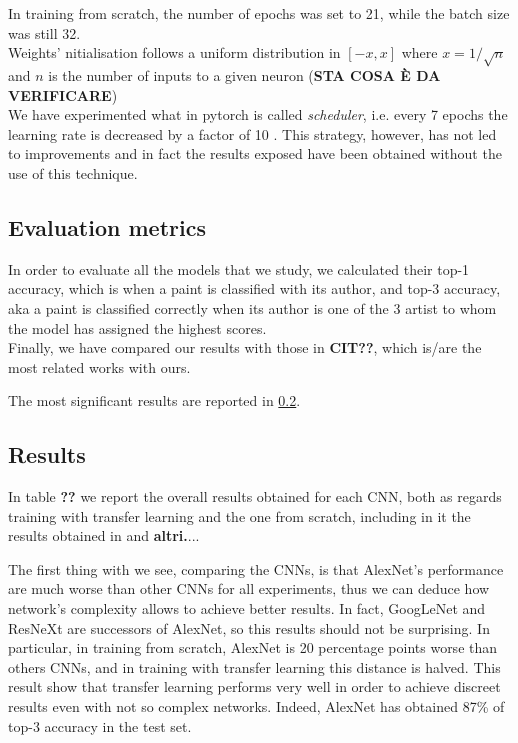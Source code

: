 \documentclass{article}
\begin{document}
In training from scratch, the number of epochs was set to 21, while the batch size was still 32.\\ 
Weights' nitialisation follows a uniform distribution in $[-x, x]$ where $x=1/\sqrt n$ and $n$ is the number of inputs to a given neuron (\textbf{STA COSA È DA VERIFICARE})\\
We have experimented what in pytorch is called \textit{scheduler}, i.e. every 7 epochs the learning rate is decreased by a factor of 10 . This strategy, however, has not led to improvements and in fact the results exposed have been obtained without the use of this technique.

\subsection{Evaluation metrics}
In order to evaluate all the models that we study, we calculated their top-1 accuracy, which is when a paint is classified with its author, and top-3 accuracy, aka a paint is classified correctly when its author is one of the 3 artist to whom the model has assigned the highest scores.\\
Finally, we have compared our results with those in \textbf{CIT??}, which is/are the most related works with ours. 

The most significant results are reported in \ref{results}.

\subsection{Results}\label{results}

In table \textbf{??} we report the overall results obtained for each CNN, both as regards training with transfer learning and the one from scratch, including in it the results obtained in \cite{ArtistIdCNN406} and \textbf{altri.}...

The first thing with we see, comparing the CNNs, is that AlexNet's performance are much worse than other CNNs for all experiments, thus we can deduce how network's complexity allows to achieve better results. In fact, GoogLeNet and ResNeXt are successors of AlexNet, so this results should not be surprising. 
In particular, in training from scratch, AlexNet is 20 percentage points worse than others CNNs, and in training with transfer learning this distance is halved. This result show that transfer learning performs very well in order to achieve discreet results even with not so complex networks. Indeed, AlexNet has obtained 87\% of top-3 accuracy in the test set.
\end{document}
